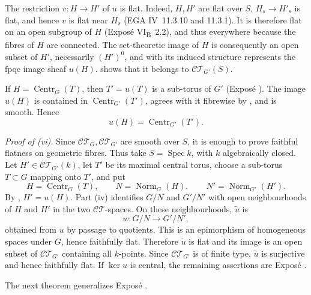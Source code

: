The restriction \(v:H\to H'\) of \(u\) is flat. Indeed, \(H,H'\) are
flat over \(S\), \(H_s\to H'_s\) is flat, and hence \(v\) is flat
near \(H_s\) (EGA IV~11.3.10 and 11.3.1). It is therefore flat on an
open subgroup of \(H\) (Exposé VI\textsubscript{B}~2.2), and thus
everywhere because the fibres of \(H\) are connected. The
set-theoretic image of \(H\) is consequently an open subset of \(H'\),
necessarily \((H')^0\), and with its induced structure represents
the fpqc image sheaf \(u(H)\).  shows that it belongs to
\(\mathcal{CT}_{G'}(S)\).

If \(H=\operatorname{Centr}_G(T)\), then \(T'=u(T)\) is a sub-torus
of \(G'\) (Exposé ). The image \(u(H)\) is contained in
\(\operatorname{Centr}_{G'}(T')\), agrees with it fibrewise by
, and is smooth. Hence
\[
  u(H)=\operatorname{Centr}_{G'}(T').
\]

\medskip\noindent\textit{Proof of (vi).}
Since \(\mathcal{CT}_G,\mathcal{CT}_{G'}\) are smooth over \(S\), it
is enough to prove faithful flatness on geometric fibres. Thus take
\(S=\operatorname{Spec}k\), with \(k\) algebraically closed. Let
\(H'\in\mathcal{CT}_{G'}(k)\), let \(T'\) be its maximal central
torus, choose a sub-torus \(T\subset G\) mapping onto \(T'\), and put
\[
 H=\operatorname{Centr}_G(T),\qquad
 N=\operatorname{Norm}_G(H),\qquad
 N'=\operatorname{Norm}_{G'}(H').
\]
By , \(H'=u(H)\). Part (iv) identifies \(G/N\) and \(G'/N'\)
with open neighbourhoods of \(H\) and \(H'\) in the two
\(\mathcal{CT}\)-spaces. On these neighbourhoods, \(\widetilde u\)
is
\[
  w:G/N\longrightarrow G'/N',
\]
obtained from \(u\) by passage to quotients. This is an epimorphism
of homogeneous spaces under \(G\), hence faithfully flat. Therefore
\(\widetilde u\) is flat and its image is an open subset of
\(\mathcal{CT}_{G'}\) containing all \(k\)-points. Since
\(\mathcal{CT}_{G'}\) is of finite type, \(\widetilde u\) is
surjective and hence faithfully flat. If \(\ker u\) is central, the
remaining assertions are Exposé .

The next theorem generalizes Exposé .

